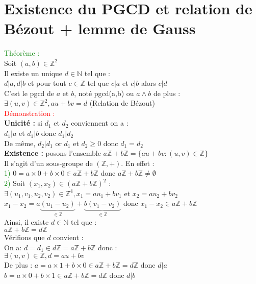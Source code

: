 \documentclass{article}
\begin{document}
\section{Existence du PGCD et relation de Bézout + lemme de Gauss}
\textcolor{green}{Théorème :} \\ 
Soit $(a,b) \in \mathbb{Z}^2$ \\ 
Il existe un unique $d \in \mathbb{N}$ tel que : \\ 
$d|a,d|b$ et pour tout $c \in \mathbb{Z}$ tel que $c|a$ et $c|b$ alors $c|d$ \\ 
C'est le pgcd de $a$ et $b$, noté pgcd(a,b) ou $a \wedge b$ de plus : \\ 
$\exists (u,v) \in \mathbb{Z}^2, au+bv=d$ (Relation de Bézout) \\ 
\textcolor{red}{Démonstration :} \\ 
{\bf Unicité :} si $d_1$ et $d_2$ conviennent on a : \\ 
$d_1 |a$ et $d_1 |b$ donc $d_1|d_2$ \\ 
De même, $d_2|d_1$ or $d_1$ et $d_2\geq 0$ donc $d_1 =d_2$ \\ 
{\bf Existence :} posons l'ensemble $a \mathbb{Z} +b\mathbb{Z}=\lbrace au+bv : (u,v) \in \mathbb{Z}\rbrace$ \\ 
Il s'agit d'un sous-groupe de $(\mathbb{Z},+)$. En effet : \\ 
\textcolor{green}{1)} $0=a\times 0+b \times 0 \in a \mathbb{Z} +b\mathbb{Z}$ donc  $a \mathbb{Z} +b\mathbb{Z}\neq \emptyset$ \\ 
\textcolor{green}{2)} Soit $(x_1,x_2) \in (a \mathbb{Z} +b\mathbb{Z})^2$ : \\ 
$\exists (u_1,v_1,u_2,v_2) \in \mathbb{Z}^4, x_1=au_1+bv_1$ et $x_2=au_2+bv_2$ \\ 
$x_1-x_2=a\underbrace{(u_1-u_2)}_{\in \mathbb{Z}}+\underbrace{b(v_1-v_2)}_{\in \mathbb{Z}}$ donc $x_1 -x_2 \in a \mathbb{Z} +b\mathbb{Z}$ \\ 
Ainsi, il existe $d \in \mathbb{N}$ tel que : \\ 
$a \mathbb{Z} +b\mathbb{Z}=d\mathbb{Z}$ \\ 
Vérifions que $d$ convient : \\ 
On a: $d=d_1 \in d \mathbb{Z}= a \mathbb{Z} +b\mathbb{Z}$ donc : \\ 
$\exists (u,v) \in \mathbb{Z}, d=au+bv$ \\ 
De plus : $a=a \times 1 +b \times 0 \in a \mathbb{Z} +b\mathbb{Z}=d \mathbb{Z}$  donc $d|a$\\
$b= a \times 0 + b \times 1 \in a \mathbb{Z} +b\mathbb{Z}=d \mathbb{Z}$ donc $d|b$ \\ 
\end{document}
